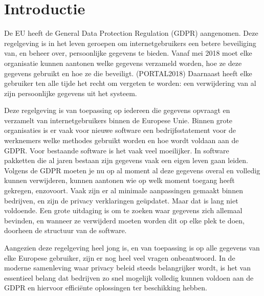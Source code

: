 
\section{Introductie} %
\label{sec:introductie}

De EU heeft de General Data Protection Regulation (GDPR) aangenomen. Deze regelgeving is in het leven geroepen om internetgebruikers een betere beveiliging van, en beheer over, persoonlijke gegevens te bieden. Vanaf mei 2018 moet elke organisatie kunnen aantonen welke gegevens verzameld worden, hoe ze deze gegevens gebruikt en hoe ze die beveiligt. (PORTAL2018) Daarnaast heeft elke gebruiker ten alle tijde het recht om vergeten te worden: een verwijdering van al zijn persoonlijke gegevens uit het systeem. 

Deze regelgeving is van toepassing op iedereen die gegevens opvraagt en verzamelt van internetgebruikers binnen de Europese Unie. Binnen grote organisaties is er vaak voor nieuwe software een bedrijfsstatement voor de werknemers welke methodes gebruikt  worden en hoe wordt voldaan aan de GDPR. Voor bestaande software is het vaak veel moeilijker. In software pakketten die al jaren bestaan zijn gegevens vaak een eigen leven gaan leiden. Volgens de GDPR moeten je nu op al moment al deze gegevens overal en volledig kunnen verwijderen, kunnen aantonen wie op welk moment toegang heeft gekregen, enzovoort. Vaak zijn er al minimale aanpassingen gemaakt binnen bedrijven, en zijn de privacy verklaringen geüpdatet. Maar dat is lang niet voldoende. Een grote uitdaging is om te zoeken waar gegevens zich allemaal bevinden, en wanneer ze verwijderd moeten worden dit op elke plek te doen, doorheen de structuur van de software.   

Aangezien deze regelgeving heel jong is, en van toepassing is op alle gegevens van elke Europese gebruiker, zijn er nog heel veel vragen onbeantwoord. In de moderne samenleving waar privacy beleid steeds belangrijker wordt, is het van essentieel belang dat bedrijven zo snel mogelijk volledig kunnen voldoen aan de GDPR en hiervoor efficiënte oplossingen ter beschikking hebben. 

